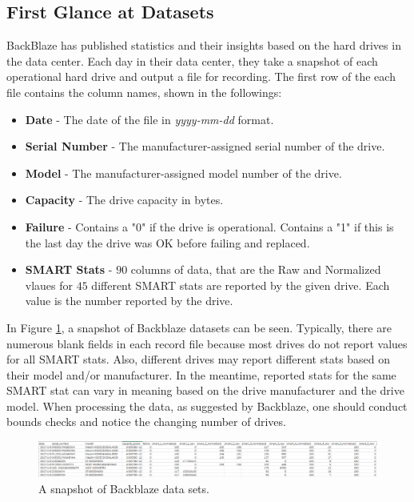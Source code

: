 \documentclass[12pt,a4paper,english]{amsart}
\begin{document}
\subsection{First Glance at Datasets}

BackBlaze has published statistics and their insights based on the hard drives in the data center.
Each day in their data center, they take a snapshot of each operational hard drive and output a file for recording.
The first row of the each file contains the column names, shown in the followings:
\begin{itemize}
	\item \textbf{Date} - The date of the file in \textit{yyyy-mm-dd} format.
	\item \textbf{Serial Number} - The manufacturer-assigned serial number of the drive.
	\item \textbf{Model} - The manufacturer-assigned model number of the drive.
	\item \textbf{Capacity} - The drive capacity in bytes.
	\item \textbf{Failure} - Contains a "0"  if the drive is operational. Contains a "1" if this is the last day the drive was OK before failing and replaced.
	\item \textbf{SMART Stats} - $90$ columns of data, that are the Raw and Normalized vlaues for $45$ different SMART stats are reported by the given drive. Each value is the number reported by the drive.
\end{itemize}

In Figure \ref{fig:snapshot}, a snapshot of Backblaze datasets can be seen. Typically, there are numerous blank fields in each record file because most drives do not report values for all SMART stats.
Also, different drives may report different stats based on their model and/or manufacturer. In the meantime, reported stats for the same SMART stat can vary in meaning based on the drive manufacturer and the drive model.
When processing the data, as suggested by Backblaze, one should conduct bounds checks and notice the changing number of drives.

\begin{figure}[htb]
	\centering
	\includegraphics[width=\textwidth]{img/snapshot_data_wide.PNG}
	\caption{A snapshot of Backblaze data sets.}\label{fig:snapshot}
\end{figure}
\end{document}
